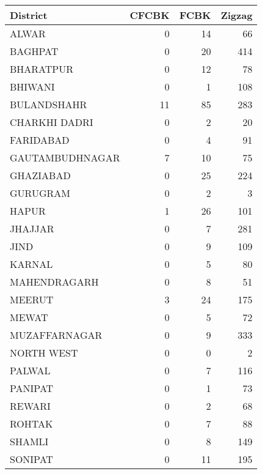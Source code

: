 \begin{tabular}{lrrr}
\toprule
District & CFCBK & FCBK & Zigzag \\
\midrule
ALWAR & 0 & 14 & 66 \\
BAGHPAT & 0 & 20 & 414 \\
BHARATPUR & 0 & 12 & 78 \\
BHIWANI & 0 & 1 & 108 \\
BULANDSHAHR & 11 & 85 & 283 \\
CHARKHI DADRI & 0 & 2 & 20 \\
FARIDABAD & 0 & 4 & 91 \\
GAUTAMBUDHNAGAR & 7 & 10 & 75 \\
GHAZIABAD & 0 & 25 & 224 \\
GURUGRAM & 0 & 2 & 3 \\
HAPUR & 1 & 26 & 101 \\
JHAJJAR & 0 & 7 & 281 \\
JIND & 0 & 9 & 109 \\
KARNAL & 0 & 5 & 80 \\
MAHENDRAGARH & 0 & 8 & 51 \\
MEERUT & 3 & 24 & 175 \\
MEWAT & 0 & 5 & 72 \\
MUZAFFARNAGAR & 0 & 9 & 333 \\
NORTH WEST & 0 & 0 & 2 \\
PALWAL & 0 & 7 & 116 \\
PANIPAT & 0 & 1 & 73 \\
REWARI & 0 & 2 & 68 \\
ROHTAK & 0 & 7 & 88 \\
SHAMLI & 0 & 8 & 149 \\
SONIPAT & 0 & 11 & 195 \\
\bottomrule
\end{tabular}
